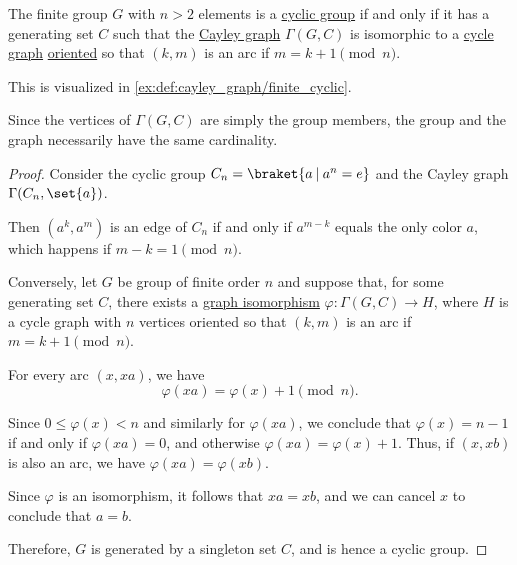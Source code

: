 \begin{proposition}\label{thm:cayley_graph_of_finite_cyclic_group}
  The finite group \( G \) with \( n > 2 \) elements is a \hyperref[def:cyclic_group]{cyclic group} if and only if it has a generating set \( C \) such that the \hyperref[def:cayley_graph]{Cayley graph} \( \Gamma(G, C) \) is isomorphic to a \hyperref[def:cycle_graph]{cycle graph} \hyperref[def:multigraph_orientation]{oriented} so that \( (k, m) \) is an arc if \( m = k + 1 \pmod n \).
\end{proposition}
\begin{comments}
  \item This is visualized in \cref{ex:def:cayley_graph/finite_cyclic}.
  \item Since the vertices of \( \Gamma(G, C) \) are simply the group members, the group and the graph necessarily have the same cardinality.
\end{comments}
\begin{proof}
  \SufficiencySubProof Consider the cyclic group \( C_n = \braket{ a \given a^n = e } \) and the Cayley graph \( \Gamma(C_n, \set{ a }) \).

  Then \( (a^k, a^m) \) is an edge of \( C_n \) if and only if \( a^{m - k} \) equals the only color \( a \), which happens if \( m - k = 1 \pmod n \).

  \NecessitySubProof Conversely, let \( G \) be group of finite order \( n \) and suppose that, for some generating set \( C \), there exists a \hyperref[def:directed_graph/homomorphism]{graph isomorphism} \( \varphi: \Gamma(G, C) \to H \), where \( H \) is a cycle graph with \( n \) vertices oriented so that \( (k, m) \) is an arc if \( m = k + 1 \pmod n \).

  For every arc \( (x, xa) \), we have
  \begin{equation*}
    \varphi(xa) = \varphi(x) + 1 \pmod n.
  \end{equation*}

  Since \( 0 \leq \varphi(x) < n \) and similarly for \( \varphi(xa) \), we conclude that \( \varphi(x) = n - 1 \) if and only if \( \varphi(xa) = 0 \), and otherwise \( \varphi(xa) = \varphi(x) + 1 \). Thus, if \( (x, xb) \) is also an arc, we have \( \varphi(xa) = \varphi(xb) \).

  Since \( \varphi \) is an isomorphism, it follows that \( xa = xb \), and we can cancel \( x \) to conclude that \( a = b \).

  Therefore, \( G \) is generated by a singleton set \( C \), and is hence a cyclic group.
\end{proof}

